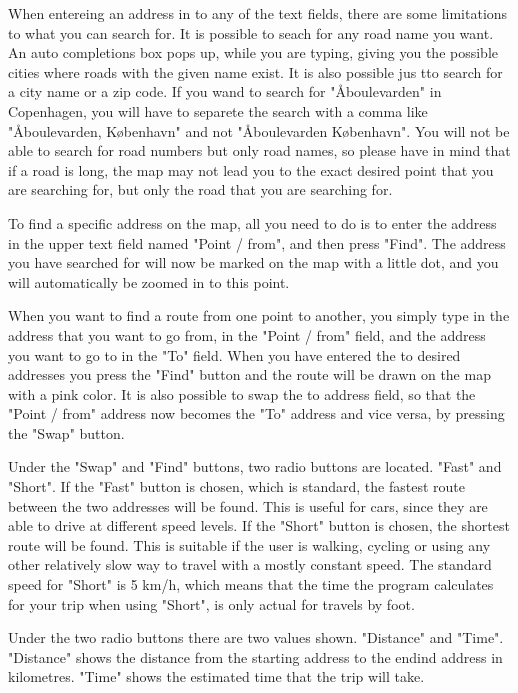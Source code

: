 When entereing an address in to any of the text fields, there are some limitations to what you can search for. It is possible to seach for any road name you want. An auto completions box pops up, while you are typing, giving you the possible cities where roads with the given name exist. It is also possible jus tto search for a city name or a zip code. If you wand to search for "\AA boulevarden" in Copenhagen, you will have to separete the search with a comma like "\AA boulevarden, K\o benhavn" and not "\AA boulevarden K\o benhavn". You will not be able to search for road numbers but only road names, so please have in mind that if a road is long, the map may not lead you to the exact desired point that you are searching for, but only the road that you are searching for.

To find a specific address on the map, all you need to do is to enter the address in the upper text field named "Point / from", and then press "Find". The address you have searched for will now be marked on the map with a little dot, and you will automatically be zoomed in to this point.

When you want to find a route from one point to another, you simply type in the address that you want to go from, in the "Point / from" field, and the address you want to go to in the "To" field. When you have entered the to desired addresses you press the "Find" button and the route will be drawn on the map with a pink color. 
It is also possible to swap the to address field, so that the "Point / from" address now becomes the "To" address and vice versa, by pressing the "Swap" button.

Under the "Swap" and "Find" buttons, two radio buttons are located. "Fast" and "Short". If the "Fast" button is chosen, which is standard, the fastest route between the two addresses will be found. This is useful for cars, since they are able to drive at different speed levels. If the "Short" button is chosen, the shortest route will be found. This is suitable if the user is walking, cycling or using any other relatively slow way to travel with a mostly constant speed. The standard speed for "Short" is 5 km/h, which means that the time the program calculates for your trip when using "Short", is only actual for travels by foot.

Under the two radio buttons there are two values shown. "Distance" and "Time". "Distance" shows the distance from the starting address to the endind address in kilometres. "Time" shows the estimated time that the trip will take. 

